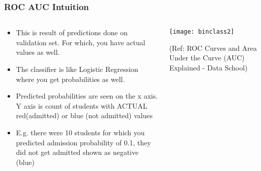 \begin{frame}[fragile]\frametitle{ROC AUC Intuition}

\begin{columns}
\begin{column}[T]{0.5\linewidth}
\begin{itemize}
\item This is result of predictions done on validation set. For which, you have actual values as well.
\item The classifier is like Logistic Regression where you get probabilities as well.
\item Predicted probabilities are seen on the x axis. Y axis is count of students with ACTUAL red(admitted) or blue (not admitted) values
\item E.g. there were 10 students for which you predicted admission probability of 0.1, they did not get admitted shown as negative (blue)
\end{itemize}
\end{column}
\begin{column}[T]{0.5\linewidth}

\begin{center}
\texttt{[image: binclass2]}
\end{center}

\tiny{(Ref: ROC Curves and Area Under the Curve (AUC) Explained - Data School)}
\end{column}

\end{columns}
\end{frame}

